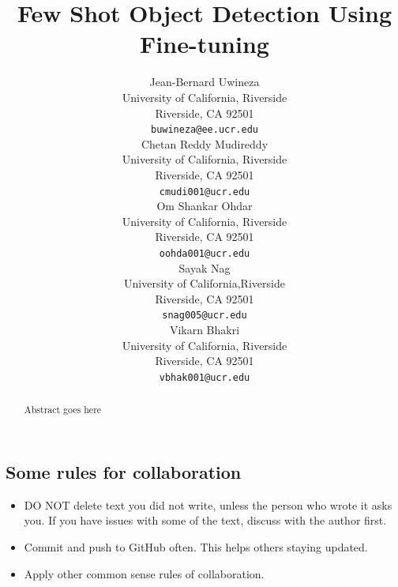 \documentclass{article}
\title{Few Shot Object Detection Using Fine-tuning}
\author{%
  Jean-Bernard Uwineza 
  \\
  University of California, Riverside\\
  Riverside, CA 92501 \\
  \texttt{buwineza@ee.ucr.edu} \\
  \And
  Chetan Reddy Mudireddy \\
  University of California, Riverside \\
  Riverside, CA 92501 \\
  \texttt{cmudi001@ucr.edu} \\
  \AND
  Om Shankar Ohdar \\
  University of California, Riverside \\
  Riverside, CA 92501 \\
  \texttt{oohda001@ucr.edu} \\
  \And
  Sayak Nag \\
  University of California,Riverside \\
  Riverside, CA 92501 \\
  \texttt{snag005@ucr.edu} \\
  \And
  Vikarn Bhakri \\
  University of California, Riverside \\
  Riverside, CA 92501 \\
  \texttt{vbhak001@ucr.edu} \\
}
\begin{document}
\maketitle

\begin{abstract} 

Abstract goes here

\end{abstract}

\subsection{Some rules for collaboration}

\begin{itemize}
  \item DO NOT delete text you did not write, unless the person who wrote it asks you. 
  If you have issues with some of the text, discuss with the author first. 
 
  \item Commit and push to GitHub often. This helps others staying updated. 

  \item Apply other common sense rules of collaboration.

\end{itemize}
\end{document}
